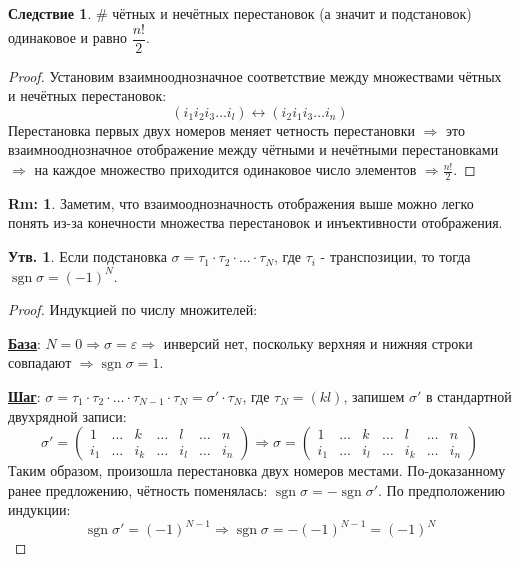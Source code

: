 \documentclass[12pt]{article}
\newcommand{\VE}{\varepsilon}
\theoremstyle{definition}
\newtheorem{rem}{Rm:}
\newtheorem{prop}{Утв.}
\newtheorem{corollary}{Следствие}
\DeclareMathOperator{\sgn}{sgn}
\begin{document}
\begin{corollary}
	$\#$ чётных и нечётных перестановок (а значит и подстановок) одинаковое и равно $\dfrac{n!}{2}$.
\end{corollary}
\begin{proof}
	Установим взаимнооднозначное соответствие между множествами чётных и нечётных перестановок:
	$$
		(i_1 i_2 i_3 \dotsc i_l) \leftrightarrow (i_2 i_1 i_3 \dotsc i_n)
	$$
	Перестановка первых двух номеров меняет четность перестановки $\Rightarrow$ это взаимнооднозначное отображение между чётными и нечётными перестановками $\Rightarrow$ на каждое множество приходится одинаковое число элементов $\Rightarrow \tfrac{n!}{2}$. 
\end{proof}
\begin{rem}
	Заметим, что взаимооднозначность отображения выше можно легко понять из-за конечности множества перестановок и инъективности отображения.
\end{rem}

\begin{prop}
	Если подстановка $\sigma = \tau_1{\cdot}\tau_2 {\cdot}\dotsc {\cdot}\tau_N$, где $\tau_i$ - транспозиции, то тогда $\sgn{\sigma} = (-1)^N$.
\end{prop}
\begin{proof}
	Индукцией по числу множителей:
	
	\textbf{\uline{База}}: $N = 0 \Rightarrow \sigma = \VE \Rightarrow$ инверсий нет, поскольку верхняя и нижняя строки совпадают $\Rightarrow \sgn{\sigma} = 1$.
	
	\textbf{\uline{Шаг}}: $\sigma = \tau_1{\cdot}\tau_2{\cdot} \dotsc {\cdot}\tau_{N-1} {\cdot}\tau_N = \sigma'{\cdot}\tau_N$, где $\tau_N = (kl)$, запишем $\sigma'$ в стандартной двухрядной записи:
	$$
		\sigma' = \begin{pmatrix}
			1 & \dotsc  & k & \dotsc & l & \dotsc & n \\
			i_1 & \dotsc & i_k & \dotsc & i_l & \dotsc & i_n
		\end{pmatrix} \Rightarrow 
		\sigma = 
		\begin{pmatrix}
			1 & \dotsc & k & \dotsc & l & \dotsc & n\\
			i_1 & \dotsc & i_l & \dotsc & i_k & \dotsc & i_n
		\end{pmatrix}
	$$
	Таким образом, произошла перестановка двух номеров местами. По-доказанному ранее предложению, чётность поменялась: $\sgn{\sigma} = -\sgn{\sigma'}$. По предположению индукции:
	$$
		\sgn{\sigma'} = (-1)^{N-1} \Rightarrow \sgn{\sigma} = -(-1)^{N-1} = (-1)^{N}
	$$
\end{proof}
\end{document}
